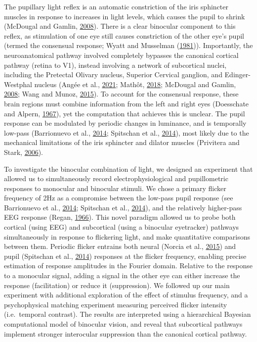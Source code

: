 \documentclass[
]{article}
\begin{document}
The pupillary light reflex is an automatic constriction of the iris sphincter muscles in response to increases in light levels, which causes the pupil to shrink (McDougal and Gamlin, \protect\hyperlink{ref-McDougal2008}{2008}). There is a clear binocular component to this reflex, as stimulation of one eye still causes constriction of the other eye's pupil (termed the consensual response; Wyatt and Musselman (\protect\hyperlink{ref-Wyatt1981}{1981})). Importantly, the neuroanatomical pathway involved completely bypasses the canonical cortical pathway (retina to V1), instead involving a network of subcortical nuclei, including the Pretectal Olivary nucleus, Superior Cervical ganglion, and Edinger-Westphal nucleus (Angée et al., \protect\hyperlink{ref-Angee2021}{2021}; Mathôt, \protect\hyperlink{ref-Mathot2018}{2018}; McDougal and Gamlin, \protect\hyperlink{ref-McDougal2008}{2008}; Wang and Munoz, \protect\hyperlink{ref-Wang2015}{2015}). To account for the consensual response, these brain regions must combine information from the left and right eyes (Doesschate and Alpern, \protect\hyperlink{ref-Doesschate1967}{1967}), yet the computation that achieves this is unclear. The pupil response can be modulated by periodic changes in luminance, and is temporally low-pass (Barrionuevo et al., \protect\hyperlink{ref-Barrionuevo2014}{2014}; Spitschan et al., \protect\hyperlink{ref-Spitschan2014}{2014}), most likely due to the mechanical limitations of the iris sphincter and dilator muscles (Privitera and Stark, \protect\hyperlink{ref-Privitera2006}{2006}).

To investigate the binocular combination of light, we designed an experiment that allowed us to simultaneously record electrophysiological and pupillometric responses to monocular and binocular stimuli. We chose a primary flicker frequency of 2Hz as a compromise between the low-pass pupil response (see Barrionuevo et al., \protect\hyperlink{ref-Barrionuevo2014}{2014}; Spitschan et al., \protect\hyperlink{ref-Spitschan2014}{2014}), and the relatively higher-pass EEG response (Regan, \protect\hyperlink{ref-Regan1966}{1966}). This novel paradigm allowed us to probe both cortical (using EEG) and subcortical (using a binocular eyetracker) pathways simultaneously in response to flickering light, and make quantitative comparisons between them. Periodic flicker entrains both neural (Norcia et al., \protect\hyperlink{ref-Norcia2015}{2015}) and pupil (Spitschan et al., \protect\hyperlink{ref-Spitschan2014}{2014}) responses at the flicker frequency, enabling precise estimation of response amplitudes in the Fourier domain. Relative to the response to a monocular signal, adding a signal in the other eye can either increase the response (facilitation) or reduce it (suppression). We followed up our main experiment with additional exploration of the effect of stimulus frequency, and a psychophysical matching experiment measuring perceived flicker intensity (i.e.~temporal contrast). The results are interpreted using a hierarchical Bayesian computational model of binocular vision, and reveal that subcortical pathways implement stronger interocular suppression than the canonical cortical pathway.
\end{document}
